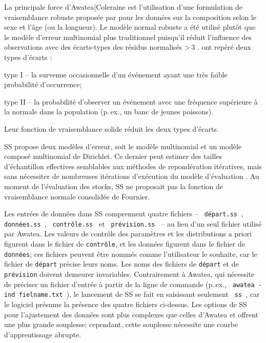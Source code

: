 \documentclass[11pt]{book}
\newcommand{\angL}{\guillemotleft\,}
\newcommand{\angR}{\,\guillemotright}
\newcommand{\code}[1]{\normalsize\texttt{#1}\normalsize}%
\begin{document}
La principale force d'Awatea|Coleraine est l'utilisation d'une formulation de vraisemblance robuste propos\'{e}e par \citet{Fournier-etal:1998} pour les donn\'{e}es sur la composition selon le sexe et l'\^{a}ge (ou la longueur). Le mod\`{e}le normal robuste a \'{e}t\'{e} utilis\'{e} plut\^{o}t que le mod\`{e}le d'erreur multinomial plus traditionnel puisqu'il r\'{e}duit l'influence des observations avec des \'{e}carts-types des r\'{e}sidus normalis\'{e}s >\,3  \citep{Fournier-etal:1990}.
\citet{Fournier-etal:1990} ont rep\'{e}r\'{e} deux types d'\'{e}carts :
\begin{itemize_csas}{}{}
	\item type I -- la survenue occasionnelle d'un \'{e}v\'{e}nement ayant une tr\`{e}s faible probabilit\'{e} d'occurrence;
	\item type II -- la probabilit\'{e} d'observer un \'{e}v\'{e}nement avec une fr\'{e}quence sup\'{e}rieure \`{a} la normale dans la population (p.\,ex., un banc de jeunes poissons).
\end{itemize_csas}
Leur fonction de vraisemblance solide r\'{e}duit les deux types d'\'{e}carts.

SS propose deux mod\`{e}les d'erreur, soit le mod\`{e}le multinomial et un mod\`{e}le compos\'{e} multinomial de Dirichlet.
Ce dernier peut estimer des tailles d'\'{e}chantillon effectives semblables aux m\'{e}thodes de repond\'{e}ration it\'{e}ratives, mais sans n\'{e}cessiter de nombreuses it\'{e}rations d'ex\'{e}cution du mod\`{e}le d'\'{e}valuation \citep{Thorson-etal:2017}.
Au moment de l'\'{e}valuation des stocks, SS ne proposait pas la fonction de vraisemblance normale consolid\'{e}e de Fournier.

Les entr\'{e}es de donn\'{e}es dans SS comprennent quatre fichiers -- \code{\angL d\'{e}part.ss\angR{}}, \code{\angL donn\'{e}es.ss\angR{}}, \code{\angL contr\^{o}le.ss\angR{}} et \code{\angL pr\'{e}vision.ss\angR{}} -- au lieu d'un seul fichier utilis\'{e} par Awatea.
Les valeurs de contr\^{o}le des param\`{e}tres et les distributions a priori figurent dans le fichier de \code{contr\^{o}le}, et les donn\'{e}es figurent dans le fichier de \code{donn\'{e}es}; ces fichiers peuvent \^{e}tre nomm\'{e}s comme l'utilisateur le souhaite, car le fichier de \code{d\'{e}part} pr\'{e}cise leurs noms.
Les noms des fichiers de \code{d\'{e}part} et de \code{pr\'{e}vision} doivent demeurer invariables.
Contrairement \`{a} Awatea, qui n\'{e}cessite de pr\'{e}ciser un fichier d'entr\'{e}e \`{a} partir de la ligne de commande (p.\,ex., \code{\angL awatea -ind fielname.txt\angR{}}), le lancement de SS se fait en saisissant seulement \code{\angL ss\angR{}}, car le logiciel pr\'{e}sume la pr\'{e}sence des quatre fichiers ci-dessus.
Les options de SS pour l'ajustement des donn\'{e}es sont plus complexes que celles d'Awatea et offrent une plus grande souplesse; cependant, cette souplesse n\'{e}cessite une courbe d'apprentissage abrupte.
\end{document}
